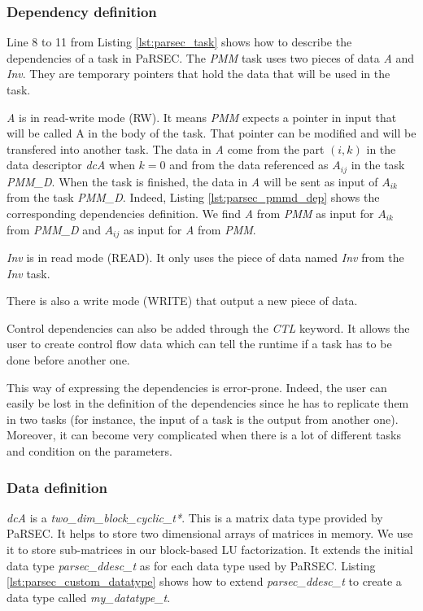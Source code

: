 \subsubsection{Dependency definition}
Line 8 to 11 from Listing \ref{lst:parsec_task} shows how to describe the dependencies of a task in PaRSEC.
The \textit{PMM} task uses two pieces of data \textit{A} and \textit{Inv}.
They are temporary pointers that hold the data that will be used in the task.

\textit{A} is in read-write mode (RW).
It means \textit{PMM} expects a pointer in input that will be called A in the body of the task.
That pointer can be modified and will be transfered into another task.
The data in \textit{A} come from the part $(i,k)$ in the data descriptor \textit{dcA} when $k=0$ and from the data referenced as \textit{$A_{ij}$} in the task \textit{PMM\_D}.
When the task is finished, the data in \textit{A} will be sent as input of \textit{$A_{ik}$} from the task \textit{PMM\_D}.
Indeed, Listing \ref{lst:parsec_pmmd_dep} shows the corresponding dependencies definition.
We find \textit{A} from \textit{PMM} as input for \textit{$A_{ik}$} from \textit{PMM\_D} and \textit{$A_{ij}$} as input for \textit{A} from \textit{PMM}.

\textit{Inv} is in read mode (READ).
It only uses the piece of data named \textit{Inv} from the \textit{Inv} task.

There is also a write mode (WRITE) that output a new piece of data.

Control dependencies can also be added through the \textit{CTL} keyword.
It allows the user to create control flow data which can tell the runtime if a task has to be done before another one.

\begin{figure}[h]

\end{figure}

This way of expressing the dependencies is error-prone.
Indeed, the user can easily be lost in the definition of the dependencies since he has to replicate them in two tasks (for instance, the input of a task is the output from another one).
Moreover, it can become very complicated when there is a lot of different tasks and condition on the parameters.

\subsubsection{Data definition}
\textit{dcA} is a \textit{two\_dim\_block\_cyclic\_t*}.
This is a matrix data type provided by PaRSEC.
It helps to store two dimensional arrays of matrices in memory.
We use it to store sub-matrices in our block-based LU factorization.
It extends the initial data type \textit{parsec\_ddesc\_t} as for each data type used by PaRSEC.
Listing \ref{lst:parsec_custom_datatype} shows how to extend \textit{parsec\_ddesc\_t} to create a data type called \textit{my\_datatype\_t}.

